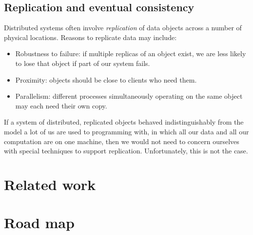 \documentclass{article}
\begin{document}
\subsection{Replication and eventual consistency}

Distributed systems often involve \emph{replication} of data objects
across a number of physical locations.  Reasons to replicate data may
include:
\begin{itemize}
\item Robustness to failure: if multiple replicas of an object exist,
  we are less likely to lose that object if part of our system fails.

\item Proximity: objects should be close to clients who need them.

\item Parallelism: different processes simultaneously operating on the
  same object may each need their own copy. 
\end{itemize}
If a system of distributed, replicated objects behaved
indistinguishably from the model a lot of us are used to programming
with, in which all our data and all our computation are on one
machine, then we would not need to concern ourselves with special
techniques to support replication.    Unfortunately, this is
not the case.

\section{Related work}

\section{Road map}



\end{document}
